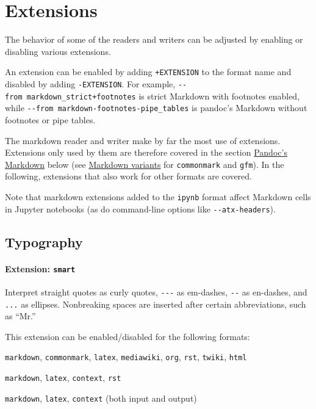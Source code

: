 \documentclass[
]{article}
\providecommand{\tightlist}{%
  \setlength{\itemsep}{0pt}\setlength{\parskip}{0pt}}
\begin{document}
\section{Extensions}\label{extensions}

The behavior of some of the readers and writers can be adjusted by
enabling or disabling various extensions.

An extension can be enabled by adding \texttt{+EXTENSION} to the format
name and disabled by adding \texttt{-EXTENSION}. For example,
\texttt{-\/-from\ markdown\_strict+footnotes} is strict Markdown with
footnotes enabled, while
\texttt{-\/-from\ markdown-footnotes-pipe\_tables} is pandoc's Markdown
without footnotes or pipe tables.

The markdown reader and writer make by far the most use of extensions.
Extensions only used by them are therefore covered in the section
\hyperref[pandocs-markdown]{Pandoc's Markdown} below (see
\hyperref[markdown-variants]{Markdown variants} for \texttt{commonmark}
and \texttt{gfm}). In the following, extensions that also work for other
formats are covered.

Note that markdown extensions added to the \texttt{ipynb} format affect
Markdown cells in Jupyter notebooks (as do command-line options like
\texttt{-\/-atx-headers}).

\subsection{Typography}\label{typography}

\paragraph{\texorpdfstring{Extension:
\texttt{smart}}{Extension: smart}}\label{extension-smart}

Interpret straight quotes as curly quotes, \texttt{-\/-\/-} as
em-dashes, \texttt{-\/-} as en-dashes, and \texttt{...} as ellipses.
Nonbreaking spaces are inserted after certain abbreviations, such as
``Mr.''

This extension can be enabled/disabled for the following formats:

\begin{description}
\tightlist
\item[input formats]
\texttt{markdown}, \texttt{commonmark}, \texttt{latex},
\texttt{mediawiki}, \texttt{org}, \texttt{rst}, \texttt{twiki},
\texttt{html}
\item[output formats]
\texttt{markdown}, \texttt{latex}, \texttt{context}, \texttt{rst}
\item[enabled by default in]
\texttt{markdown}, \texttt{latex}, \texttt{context} (both input and
output)
\end{description}
\end{document}
